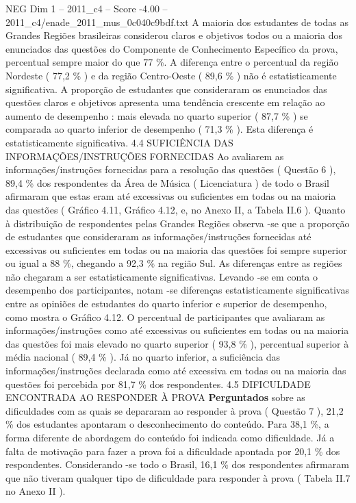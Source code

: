 \begin{textsample}{NEG Dim 1 – 2011\_c4 – Score -4.00 – 2011\_c4/enade\_2011\_mus\_0c040c9bdf.txt}
A maioria dos estudantes de todas as Grandes Regiões brasileiras considerou claros e objetivos todos ou a maioria dos enunciados das questões do Componente de Conhecimento Específico da prova, percentual sempre maior do que 77 \%.
A diferença entre o percentual da região Nordeste ( 77,2 \% ) e da região Centro-Oeste ( 89,6 \% ) não é estatisticamente significativa.
A proporção de estudantes que consideraram os enunciados das questões claros e objetivos apresenta uma tendência crescente em relação ao aumento de desempenho : mais elevada no quarto superior ( 87,7 \% ) se comparada ao quarto inferior de desempenho ( 71,3 \% ).
Esta diferença é estatisticamente significativa. 4.4 SUFICIÊNCIA DAS INFORMAÇÕES/INSTRUÇÕES FORNECIDAS Ao avaliarem as informações/instruções fornecidas para a resolução das questões ( Questão 6 ), 89,4 \% dos respondentes da Área de Música ( Licenciatura ) de todo o Brasil afirmaram que estas eram até excessivas ou suficientes em todas ou na maioria das questões ( Gráfico 4.11, Gráfico 4.12, e, no Anexo II, a Tabela II.6 ).
Quanto à distribuição de respondentes pelas Grandes Regiões observa -se que a proporção de estudantes que consideraram as informações/instruções fornecidas até excessivas ou suficientes em todas ou na maioria das questões foi sempre superior ou igual a 88 \%, chegando a 92,3 \% na região Sul.
As diferenças entre as regiões não chegaram a ser estatisticamente significativas.
Levando -se em conta o desempenho dos participantes, notam -se diferenças estatisticamente significativas entre as opiniões de estudantes do quarto inferior e superior de desempenho, como mostra o Gráfico 4.12.
O percentual de participantes que avaliaram as informações/instruções como até excessivas ou suficientes em todas ou na maioria das questões foi mais elevado no quarto superior ( 93,8 \% ), percentual superior à média nacional ( 89,4 \% ).
Já no quarto inferior, a suficiência das informações/instruções declarada como até excessiva em todas ou na maioria das questões foi percebida por 81,7 \% dos respondentes. 4.5 DIFICULDADE ENCONTRADA AO RESPONDER À PROVA \textbf{Perguntados} sobre as dificuldades com as quais se depararam ao responder à prova ( Questão 7 ), 21,2 \% dos estudantes apontaram o desconhecimento do conteúdo.
Para 38,1 \%, a forma diferente de abordagem do conteúdo foi indicada como dificuldade.
Já a falta de motivação para fazer a prova foi a dificuldade apontada por 20,1 \% dos respondentes.
Considerando -se todo o Brasil, 16,1 \% dos respondentes afirmaram que não tiveram qualquer tipo de dificuldade para responder à prova ( Tabela II.7 no Anexo II ).

\end{textsample}
